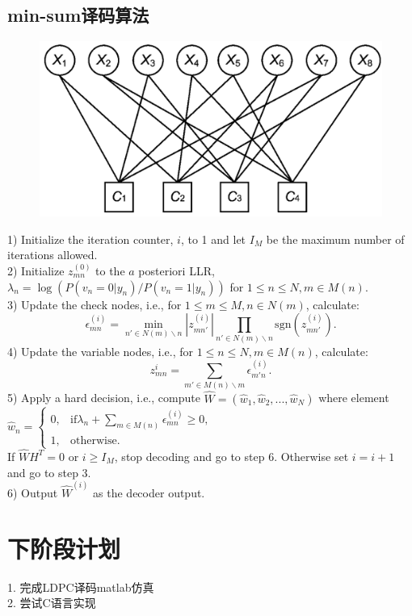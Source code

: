 \documentclass{article}
\begin{document}
\subsection{min-sum译码算法}
\begin{figure}[H]
	\centering
	\includegraphics[width = .4\textwidth]{Tanner.png}
\end{figure}

1) Initialize the iteration counter, $i$, to 1 and let $I_M$ be the maximum number of 
iterations allowed.\\
2) Initialize $z^{(0)}_{mn}$ to the $a$ posteriori LLR, $\lambda _n=\log(P(v_n=0|y_n)/
P(v_n=1|y_n))$ for $1\leq n\leq N,m\in M(n)$.\\
3) Update the check nodes, i.e., for $1\leq m\leq M, n\in N(m)$, calculate:
\begin{equation}
	\epsilon^{(i)}_{mn}=\min_{n'\in N(m)\backslash n}|z^{(i)}_{mn'}|\prod_{n'\in 
	N(m)\backslash n}\mathrm {sgn}(z^{(i)}_{mn'}).
\end{equation}
4) Update the variable nodes, i.e., for $1\leq n \leq N,m\in M(n)$, calculate:
\begin{equation}
	z^{i}_{mn}=\sum_{m'\in M(n)\backslash m}\epsilon^{(i)}_{m'n}.
\end{equation}
5) Apply a hard decision, i.e., compute $\hat{W}=(\hat{w}_1,\hat{w}_2,...,\hat{w}_N)$
where element $\hat{w}_n=\left\{\begin{aligned}
	0, & \mathrm{if} \lambda _n+\sum\nolimits_{m\in M(n)}\epsilon^{(i)}_{mn}\geq 0, \\
	1, & \mathrm{otherwise}.\end{aligned}
	\right.$\\
If $\hat{W}H^T=0$ or $i\geq I_M$, stop decoding and go to step 6. Otherwise set 
$i=i+1$ and go to step 3.\\
6) Output $\hat{W}^{(i)}$ as the decoder output.






\section{下阶段计划}
1. 完成LDPC译码matlab仿真\\
2. 尝试C语言实现
\end{document}
